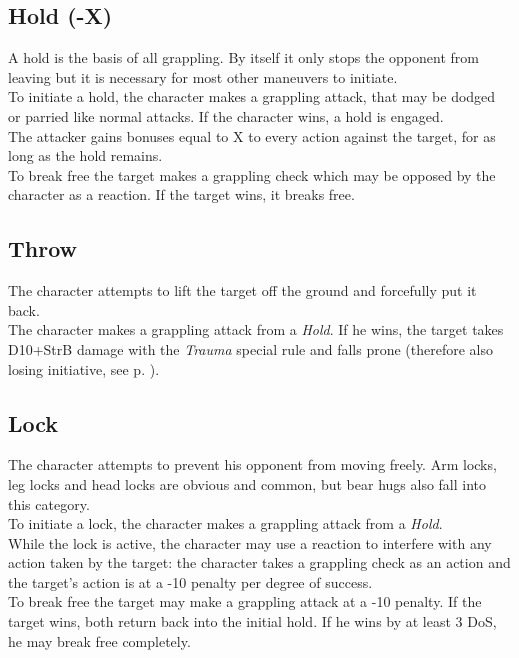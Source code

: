 \subsection*{Hold (-X)}
A hold is the basis of all grappling. By itself it only stops the opponent from leaving but it is necessary for most other maneuvers to initiate.\\
To initiate a hold, the character makes a grappling attack,
	that may be dodged or parried like normal attacks.
If the character wins, a hold is engaged.
\\%
The attacker gains bonuses equal to X to every action against the target, for as long as the hold remains.\\
To break free the target makes a grappling check which may be opposed by the character as a reaction. If the target wins, it breaks free.
\subsection*{Throw}
The character attempts to lift the target off the ground and forcefully put it back.\\
The character makes a grappling attack from a \emph{Hold}.
If he wins,
	the target takes D10+StrB damage
	with the \emph{Trauma} special rule
	and falls prone
	(therefore also losing initiative, see p. \pageref{subsec:variableini}).
\subsection*{Lock}
The character attempts to prevent his opponent from moving freely.
Arm locks, leg locks and head locks are obvious and common,
	but bear hugs also fall into this category.
\\%
To initiate a lock, the character makes a grappling attack from a \emph{Hold}.
\\%
While the lock is active,
	the character may use a reaction to interfere with any action taken by the target:
	the character takes a grappling check as an action
	and the target’s action is at a -10 penalty per degree of success.\\
To break free the target may make a grappling attack at a -10  penalty.
If the target wins, both return back into the initial hold.
If he wins by at least 3 DoS, he may break free completely.
